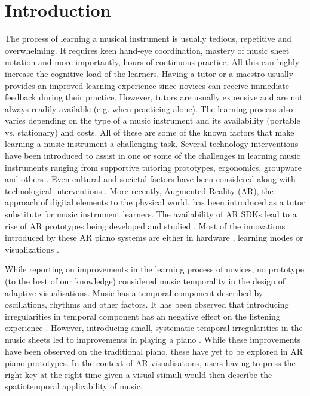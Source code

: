 \documentclass[manuscript,screen]{acmart}
\begin{document}
\section{Introduction}
The process of learning a musical instrument is usually tedious, repetitive and overwhelming. It requires keen hand-eye coordination, mastery of music sheet notation and more importantly, hours of continuous practice. All this can highly increase the cognitive load of the learners. Having a tutor or a maestro usually provides an improved learning experience since novices can receive immediate feedback during their practice. However, tutors are usually expensive and are not always readily-available (e.g. when practicing alone). The learning process also varies depending on the type of a music instrument and its availability (portable vs. stationary) and costs. All of these are some of the known factors that make learning a music instrument a challenging task.
Several technology interventions have been introduced to assist in one or some of the challenges in learning music instruments ranging from supportive tutoring prototypes, ergonomics, groupware and others \cite{fober2007vemus, daniel2006exploring}. Even cultural and societal factors have been considered along with technological interventions \cite{creech2010learning, cope1997cultural}. More recently, Augmented Reality (AR), the approach of digital elements to the physical world, has been introduced as a tutor substitute for music instrument learners. The availability of AR SDKs lead to a rise of AR prototypes being developed and studied \cite{santos2013augmented}. Most of the innovations introduced by these AR piano systems are either in hardware \cite{barakonyi2005augmented, huang2011piano}, learning modes \cite{rogers2014piano} or visualizations \cite{chow2013music}. 

While reporting on improvements in the learning process of novices, no prototype (to the best of our knowledge) considered music temporality in the design of adaptive visualisations. Music has a temporal component described by oscillations, rhythms and other factors. It has been observed that introducing irregularities in temporal component has an negative effect on the listening experience \cite{lippman1984progressive}. However, introducing  small, systematic temporal irregularities in the music sheets led to improvements in playing a piano \cite{large2002perceiving}. While these improvements have been observed on the traditional piano, these have yet to be explored in AR piano prototypes. In the context of AR visualisations, users having to press the right key at the right time given a visual stimuli would then describe the spatiotemporal applicability of music.
 
\end{document}
